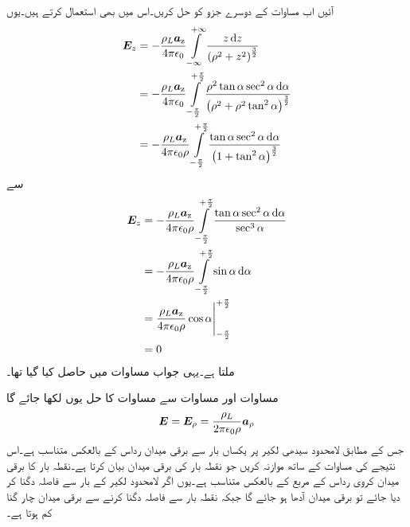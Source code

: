 آئیں اب مساوات  کے   دوسرے جزو کو حل کریں۔اس میں بھی  استعمال کرتے ہیں۔یوں
\begin{align*}
\Ez&=-\frac{\rho_L \az}{4 \pi \epsilon_0}\int\limits_{-\infty}^{+\infty} \frac{z \dif z}{\left(\rho^2+z^2 \right)^{\frac{3}{2}}}\\
&=-\frac{\rho_L \az}{4 \pi \epsilon_0}\int\limits_{-\frac{\pi}{2}}^{+\frac{\pi}{2}} \frac{\rho^2 \tan \alpha  \sec^2 \alpha \dif \alpha}{\left(\rho^2+\rho^2 \tan^2 \alpha \right)^{\frac{3}{2}}}\\
&=-\frac{\rho_L \az}{4 \pi \epsilon_0 \rho}\int\limits_{-\frac{\pi}{2}}^{+\frac{\pi}{2}} \frac{ \tan \alpha  \sec^2 \alpha \dif \alpha}{\left(1+ \tan^2 \alpha \right)^{\frac{3}{2}}}
\end{align*}
سے
\begin{gather}
\begin{aligned}\label{مساوات_کولمب_لامحدود_لکیر_عمودی_میدان}
\Ez&=-\frac{\rho_L \az}{4 \pi \epsilon_0 \rho}\int\limits_{-\frac{\pi}{2}}^{+\frac{\pi}{2}} \frac{ \tan \alpha  \sec^2 \alpha \dif \alpha}{\sec^3 \alpha}\\
&=-\frac{\rho_L \az}{4 \pi \epsilon_0 \rho}\int\limits_{-\frac{\pi}{2}}^{+\frac{\pi}{2}} \sin \alpha \dif \alpha\\
&=\frac{\rho_L \az}{4 \pi \epsilon_0 \rho} \eval{\cos \alpha}_{-\frac{\pi}{2}}^{+\frac{\pi}{2}}\\
&=0
\end{aligned}
\end{gather}
ملتا ہے۔یہی جواب مساوات  میں حاصل کیا گیا تھا۔

مساوات  اور مساوات  سے مساوات   کا حل یوں لکھا جائے گا
\begin{align}\label{مساوات_کولمب_لامحدود_لکیر_رداسی_میدان_پیدا_کرتا_ہے}
{\ensuremath{{\boldsymbol{E}}}}={\boldsymbol{E}}_{\rho}=\frac{\rho_L }{2 \pi \epsilon_0 \rho} {\boldsymbol{a}}_{\rho}
\end{align}
جس کے مطابق لامحدود سیدھی لکیر پر یکساں بار سے برقی میدان رداس   کے بالعکس متناسب ہے۔اس نتیجے  کی مساوات  کے ساتھ موازنہ کریں جو نقطہ بار کی برقی میدان بیان کرتا ہے۔نقطہ بار کا برقی میدان کروی رداس کے مربع کے بالعکس متناسب ہے۔یوں اگر لامحدود لکیر کے بار سے فاصلہ دگنا کر دیا جائے تو برقی میدان آدھا ہو جائے گا جبکہ نقطہ بار سے فاصلہ دگنا کرنے سے برقی میدان چار گنا کم ہوتا ہے۔

